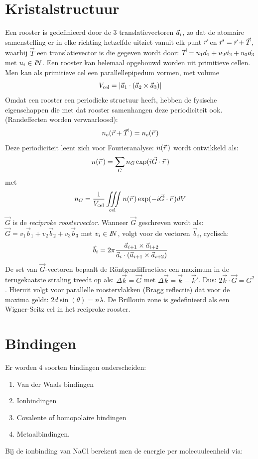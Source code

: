 \documentclass[twoside]{report}
\begin{document}
\section{Kristalstructuur}
Een rooster is gedefinieerd door de 3 translatievectoren $\vec{a}_i$,
zo dat de atomaire samenstelling er in elke richting hetzelfde uitziet
vanuit elk punt $\vec{r}$ en $\vec{r}'=\vec{r}+\vec{T}$, waarbij
$\vec{T}$ een translatievector is die gegeven wordt door:
$\vec{T}=u_1\vec{a}_1+u_2\vec{a}_2+u_3\vec{a}_3$ met $u_i\in I\hspace{-1mm}N$.
Een rooster kan helemaal opgebouwd worden uit primitieve cellen.
Men kan als primitieve cel een parallellepipedum vormen, met volume
\[
V_{\rm cel}=|\vec{a}_1\cdot(\vec{a}_2\times\vec{a}_3)|
\]
Omdat een rooster een periodieke structuur heeft, hebben de fysische
eigenschappen die met dat rooster samenhangen deze periodiciteit ook.
(Randeffecten worden verwaarloosd):
\[
n_{\rm e}(\vec{r}+\vec{T}\,)=n_{\rm e}(\vec{r}\,)
\]
Deze periodiciteit leent zich voor Fourieranalyse: $n(\vec{r}\,)$
wordt ontwikkeld als:
\[
n(\vec{r}\,)=\sum\limits_G n_G\exp(i\vec{G}\cdot\vec{r}\,)
\]
met
\[
n_G=\frac{1}{V_{\rm cel}}\int\hspace{-2mm}\int\limits_{\rm cel}\hspace{-2mm}
\int n(\vvec{r})\exp(-i\vec{G}\cdot\vvec{r})dV
\]
$\vec{G}$ is de {\it reciproke roostervector}. Wanneer $\vec{G}$ geschreven
wordt als: $\vec{G}=v_1\vec{b}_1+v_2\vec{b}_2+v_3 \vec{b}_3$ met $v_i\in I\hspace{-1mm}N$,
volgt voor de vectoren $\vec{b}_i$, cyclisch:
\[
\vec{b}_i=2\pi\frac{\vec{a}_{i+1}\times\vec{a}_{i+2}}
{\vec{a}_i\cdot(\vec{a}_{i+1}\times\vec{a}_{i+2})}
\]
De set van $\vec{G}$-vectoren bepaalt de R\"ontgendiffracties: een
maximum in de terugekaatste straling treedt op als:
$\Delta\vec{k}=\vec{G}$ met $\Delta\vec{k}=\vec{k}-\vec{k}'$. Dus:
$2\vec{k}\cdot\vec{G}=G^2$. Hieruit volgt voor parallelle roostervlakken
(Bragg reflectie) dat voor de maxima geldt: $2d\sin(\theta)=n\lambda$.
\npar
De Brillouin zone is gedefinieerd als een Wigner-Seitz cel in het
reciproke rooster.

\section{Bindingen}
Er worden 4 soorten bindingen onderscheiden:
\begin{enumerate}
\item Van der Waals bindingen
\item Ionbindingen
\item Covalente of homopolaire bindingen
\item Metaalbindingen.
\end{enumerate}
Bij de ionbinding van NaCl berekent men de energie per molecuuleenheid via:
\end{document}

